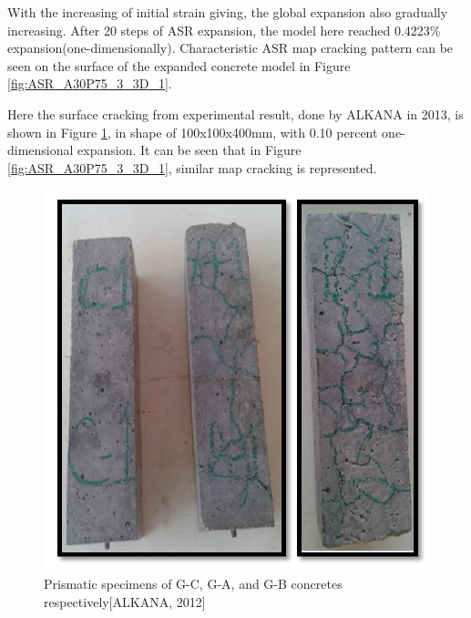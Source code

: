 
With the increasing of initial strain giving, the global expansion also gradually increasing. After 20 steps of ASR expansion, the model here reached 0.4223\% expansion(one-dimensionally). Characteristic ASR map cracking pattern can be seen on the surface of the expanded concrete model in Figure \ref{fig:ASR_A30P75_3_3D_1}.

Here the surface cracking from experimental result, done by ALKANA in 2013, is shown in Figure \ref{ALKANASRcrack}, in shape of 100x100x400mm, with 0.10 percent one-dimensional expansion. It can be seen that in Figure \ref{fig:ASR_A30P75_3_3D_1}, similar map cracking is represented.

  \begin{figure}[ht!]
  \centering
  \includegraphics[width=.8\linewidth]{Reference/ALKANASRcrack.png}
    \caption{Prismatic specimens of G-C, G-A, and G-B concretes respectively[ALKANA, 2012]}
    \label{ALKANASRcrack}
  \end{figure}


